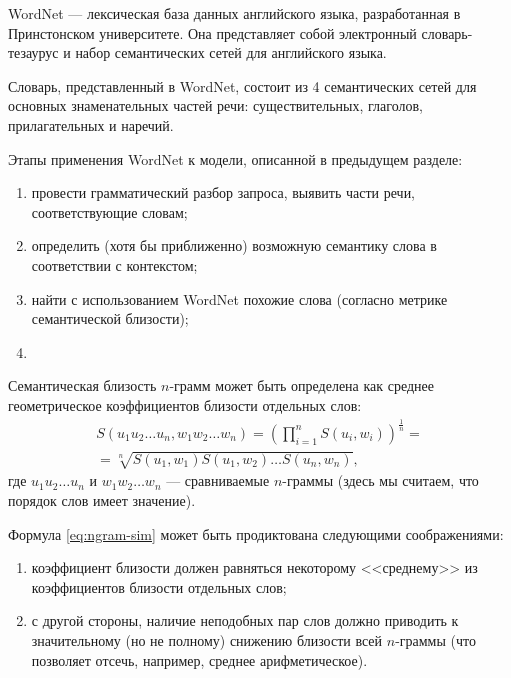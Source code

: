 
WordNet \cite{Miller95wordnet:a} --- лексическая база данных английского языка, разработанная в Принстонском университете. 
Она представляет собой электронный словарь-тезаурус и набор семантических сетей для английского языка. 

Словарь, представленный в WordNet, состоит из 4 семантических сетей для основных знаменательных частей речи: 
существительных, глаголов, прилагательных и наречий.

Этапы применения WordNet к модели, описанной в предыдущем разделе:
\begin{enumerate}[1)]
    \item провести грамматический разбор запроса, выявить части речи, соответствующие словам;
    \item определить (хотя бы приближенно) возможную семантику слова в соответствии с контекстом;
    \item найти с использованием WordNet похожие слова (согласно метрике семантической близости);
    \item 
\end{enumerate}

Семантическая близость $n$-грамм может быть определена как среднее геометрическое коэффициентов близости отдельных слов:
\begin{equation}
    \label{eq:ngram-sim}
    \begin{aligned}
    S(u_1u_2\dots u_n, w_1w_2\dots w_n) = \left( \prod\limits_{i=1}^n {S(u_i, w_i)} \right)^{\frac1n}= \\
    = \sqrt[n]{S(u_1, w_1)S(u_1, w_2)\dots S(u_n, w_n)},
    \end{aligned}
\end{equation}
где $u_1u_2\dots u_n$ и $w_1w_2\dots w_n$ --- сравниваемые $n$-граммы (здесь мы считаем, что порядок слов имеет значение).

Формула \eqref{eq:ngram-sim} может быть продиктована следующими соображениями:
\begin{enumerate}[1)]
    \item коэффициент близости должен равняться некоторому <<среднему>> из коэффициентов близости отдельных слов;
    \item с другой стороны, наличие неподобных пар слов должно приводить к значительному (но не полному) снижению 
    близости всей $n$-граммы (что позволяет отсечь, например, среднее арифметическое).
\end{enumerate}